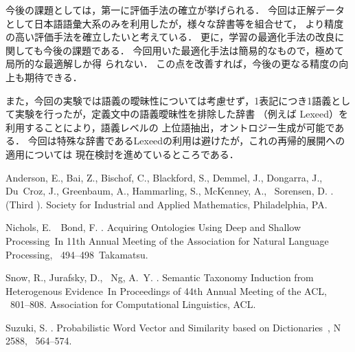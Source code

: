 \documentclass[japanese]{jnlp_1.4}
\begin{document}
今後の課題としては，第一に評価手法の確立が挙げられる．
今回は正解データとして日本語語彙大系のみを利用したが，様々な辞書等を組合せて，
より精度の高い評価手法を確立したいと考えている．
更に，学習の最適化手法の改良に関しても今後の課題である．
今回用いた最適化手法は簡易的なもので，極めて局所的な最適解しか得
られない．
この点を改善すれば，今後の更なる精度の向上も期待できる．

また，今回の実験では語義の曖昧性については考慮せず，1表記につき1語義とし
て実験を行ったが，定義文中の語義曖昧性を排除した辞書
（例えば Lexeed\cite{lexeed}）を利用することにより，語義レベルの
上位語抽出，オントロジー生成が可能である．
今回は特殊な辞書であるLexeedの利用は避けたが，これの再帰的展開への適用については
現在検討を進めているところである． 



\begin{thebibliography}{}

Anderson, E., Bai, Z., Bischof, C., Blackford, S., Demmel, J., Dongarra, J.,
  Du~Croz, J., Greenbaum, A., Hammarling, S., McKenney, A., \BBA\ Sorensen, D.
  \BBCP.
 (Third \BEd).
\newblock Society for Industrial and Applied Mathematics, Philadelphia, PA.

Nichols, E.\BBACOMMA\ \BBA\ Bond, F. \BBCP.
\newblock \BBOQ Acquiring Ontologies Using Deep and Shallow Processing\BBCQ\
\newblock In {\Bem 11th Annual Meeting of the Association for Natural Language
  Processing}, \mbox{\BPGS\ 494--498}\ Takamatsu.

Snow, R., Jurafsky, D., \BBA\ Ng, A.~Y. \BBCP.
\newblock \BBOQ Semantic Taxonomy Induction from Heterogenous Evidence\BBCQ\
\newblock In {\Bem Proceedings of 44th Annual Meeting of the ACL}, \mbox{\BPGS\
  801--808}. Association for Computational Linguistics, ACL.

\bibitem[\protect\BCAY{Suzuki}{Suzuki}{2003}]{Suzuki2}
Suzuki, S. \BBOP 2003\BBCP.
\newblock \BBOQ Probabilistic Word Vector and Similarity based on
  Dictionaries\BBCQ\
, {\Bbf
  \textmd{N 2588}}, \mbox{\BPGS\ 564--574}.


\end{thebibliography}
\end{document}
